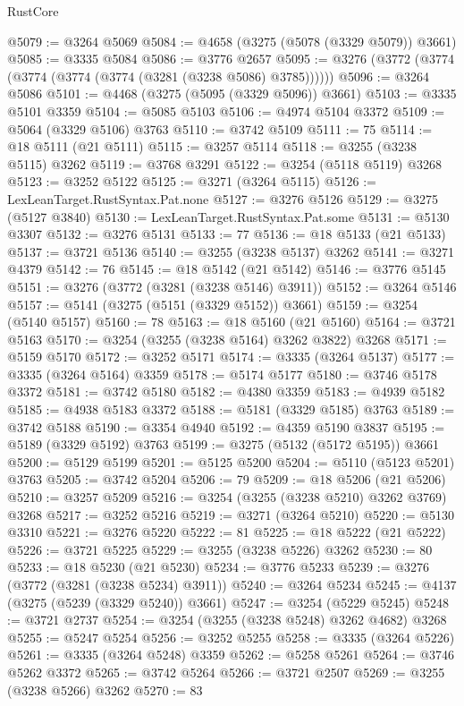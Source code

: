 \begin{lexlean}{RustCore}
\begin{coremodule}
@5079 := @3264 @5069
@5084 := @4658 (@3275 (@5078 (@3329 @5079)) @3661)
@5085 := @3335 @5084
@5086 := @3776 @2657
@5095 := @3276 (@3772 (@3774 (@3774 (@3774 (@3774 (@3281 (@3238 @5086) @3785))))))
@5096 := @3264 @5086
@5101 := @4468 (@3275 (@5095 (@3329 @5096)) @3661)
@5103 := @3335 @5101 @3359
@5104 := @5085 @5103
@5106 := @4974 @5104 @3372
@5109 := @5064 (@3329 @5106) @3763
@5110 := @3742 @5109
@5111 := 75
@5114 := @18 @5111 (@21 @5111)
@5115 := @3257 @5114
@5118 := @3255 (@3238 @5115) @3262
@5119 := @3768 @3291
@5122 := @3254 (@5118 @5119) @3268
@5123 := @3252 @5122
@5125 := @3271 (@3264 @5115)
@5126 := LexLeanTarget.RustSyntax.Pat.none
@5127 := @3276 @5126
@5129 := @3275 (@5127 @3840)
@5130 := LexLeanTarget.RustSyntax.Pat.some
@5131 := @5130 @3307
@5132 := @3276 @5131
@5133 := 77
@5136 := @18 @5133 (@21 @5133)
@5137 := @3721 @5136
@5140 := @3255 (@3238 @5137) @3262
@5141 := @3271 @4379
@5142 := 76
@5145 := @18 @5142 (@21 @5142)
@5146 := @3776 @5145
@5151 := @3276 (@3772 (@3281 (@3238 @5146) @3911))
@5152 := @3264 @5146
@5157 := @5141 (@3275 (@5151 (@3329 @5152)) @3661)
@5159 := @3254 (@5140 @5157)
@5160 := 78
@5163 := @18 @5160 (@21 @5160)
@5164 := @3721 @5163
@5170 := @3254 (@3255 (@3238 @5164) @3262 @3822) @3268
@5171 := @5159 @5170
@5172 := @3252 @5171
@5174 := @3335 (@3264 @5137)
@5177 := @3335 (@3264 @5164) @3359
@5178 := @5174 @5177
@5180 := @3746 @5178 @3372
@5181 := @3742 @5180
@5182 := @4380 @3359
@5183 := @4939 @5182
@5185 := @4938 @5183 @3372
@5188 := @5181 (@3329 @5185) @3763
@5189 := @3742 @5188
@5190 := @3354 @4940
@5192 := @4359 @5190 @3837
@5195 := @5189 (@3329 @5192) @3763
@5199 := @3275 (@5132 (@5172 @5195)) @3661
@5200 := @5129 @5199
@5201 := @5125 @5200
@5204 := @5110 (@5123 @5201) @3763
@5205 := @3742 @5204
@5206 := 79
@5209 := @18 @5206 (@21 @5206)
@5210 := @3257 @5209
@5216 := @3254 (@3255 (@3238 @5210) @3262 @3769) @3268
@5217 := @3252 @5216
@5219 := @3271 (@3264 @5210)
@5220 := @5130 @3310
@5221 := @3276 @5220
@5222 := 81
@5225 := @18 @5222 (@21 @5222)
@5226 := @3721 @5225
@5229 := @3255 (@3238 @5226) @3262
@5230 := 80
@5233 := @18 @5230 (@21 @5230)
@5234 := @3776 @5233
@5239 := @3276 (@3772 (@3281 (@3238 @5234) @3911))
@5240 := @3264 @5234
@5245 := @4137 (@3275 (@5239 (@3329 @5240)) @3661)
@5247 := @3254 (@5229 @5245)
@5248 := @3721 @2737
@5254 := @3254 (@3255 (@3238 @5248) @3262 @4682) @3268
@5255 := @5247 @5254
@5256 := @3252 @5255
@5258 := @3335 (@3264 @5226)
@5261 := @3335 (@3264 @5248) @3359
@5262 := @5258 @5261
@5264 := @3746 @5262 @3372
@5265 := @3742 @5264
@5266 := @3721 @2507
@5269 := @3255 (@3238 @5266) @3262
@5270 := 83

\end{coremodule}
\end{lexlean}
